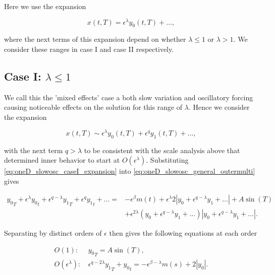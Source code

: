 Here we use the expansion 

\begin{equation*}
x(t,T) = \epsilon^{\lambda}y_0(t,T) +\ldots ,
\end{equation*}

where the next terms of this expansion depend on whether $\lambda\le1$ or $\lambda> 1$. We consider these ranges in case I and case II respectively.

\subsection{Case I: $\lambda \le 1$}
\label{subsec:oneD_slowosc_caseI}

We call this the 'mixed effects' case a both slow variation and oscillatory forcing causing noticeable effects on the solution for this range of $\lambda$. Hence we consider the expansion

\begin{equation}\label{eq:oneD_slowosc_caseI_expansion}
x(t,T)\sim \epsilon^{\lambda} y_0(t,T)+\epsilon^q y_1(t,T)+\ldots,
\end{equation}

with the next term $q>\lambda$ to be consistent with the scale analysis above that determined inner behavior to start at $O(\epsilon^\lambda)$. Substituting \eqref{eq:oneD_slowosc_caseI_expansion} into \eqref{eq:oneD_slowosc_general_outermulti} gives

\begin{equation*}
\begin{aligned}
{y_0}_T+\epsilon^{\lambda}{y_0}_t+\epsilon^{q-\lambda} {y_1}_T+\epsilon^{q} {y_1}_t+\ldots={} & -\epsilon^{\beta}m(t)+\epsilon^\lambda 2|y_0 +\epsilon^{q-\lambda} y_1+\ldots|+ A\sin(T) \\
& + \epsilon^{2\lambda}( y_0 +\epsilon^{q-\lambda} y_1+\ldots)|y_0 +\epsilon^{q-\lambda} y_1+\ldots |.
\end{aligned}
\end{equation*}

Separating by distinct orders of $\epsilon$ then gives the following equations at each order

\begin{align} \label{eq:oneD_slowosc_caseI_O1}
O(1): & \,{y_0}_T = A\sin(T),\\ \label{eq:oneD_slowosc_caseI_O2}
O(\epsilon^\lambda):  &\, \epsilon^{q-2\lambda}{y_1}_T+{y_0}_t=-\epsilon^{\beta-\lambda}m(s)+2|y_0|.
\end{align}

